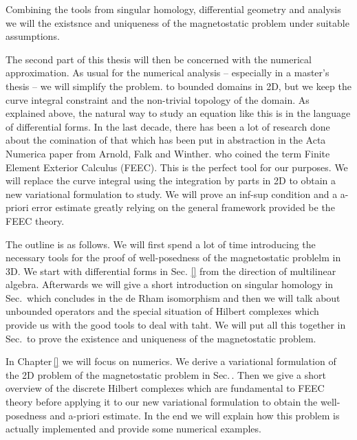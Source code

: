 \documentclass[../master_thesis.tex]{subfiles}
\begin{document}
Combining the tools from singular homology, differential geometry and 
analysis we will the existsnce and uniqueness of the magnetostatic problem 
under suitable assumptions.

The second part of this thesis will then be concerned with the numerical approximation. 
As usual for the numerical analysis -- especially in a master's thesis -- we 
will simplify the problem. to bounded domains in 2D, but we keep the curve integral 
constraint and the non-trivial topology of the domain. As explained above, the natural 
way to study an equation like this is in the language of differential forms. 
In the last decade, there has been a lot of research done about the comination of that 
which has been put in abstraction in the Acta Numerica paper from Arnold, Falk and Winther. 
\cite{} who coined the term Finite Element Exterior Calculus (FEEC). This is the perfect 
tool for our purposes. We will replace the curve integral using the integration 
by parts in 2D to obtain a new variational formulation to study. We will prove 
an inf-sup condition and a a-priori error estimate greatly relying on the 
general framework provided be the FEEC theory. 

The outline is as follows. We will first spend a lot of time 
introducing the necessary tools for the proof of well-posedness of the magnetostatic problelm 
in 3D. We start with differential forms in Sec. \ref{} from the direction 
of multilinear algebra. Afterwards we will give a short introduction on 
singular homology in Sec.\, which concludes in the de Rham isomorphism and then 
we will talk about unbounded operators and the special situation of Hilbert 
complexes which provide us with the good tools to deal with taht. 
We will put all this together in Sec.\, to prove the existence and uniqueness 
of the magnetostatic problem. 

In Chapter\,\ref{} we will focus on numerics. We derive a variational formulation of the 2D problem of the 
magnetostatic problem in Sec.\,. Then we give a short overview of the discrete Hilbert complexes 
which are fundamental to FEEC theory before applying it to our new variational formulation 
to obtain the well-posedness and a-priori estimate. In the end we will explain how this 
problem is actually implemented and provide some numerical examples.
\end{document}
